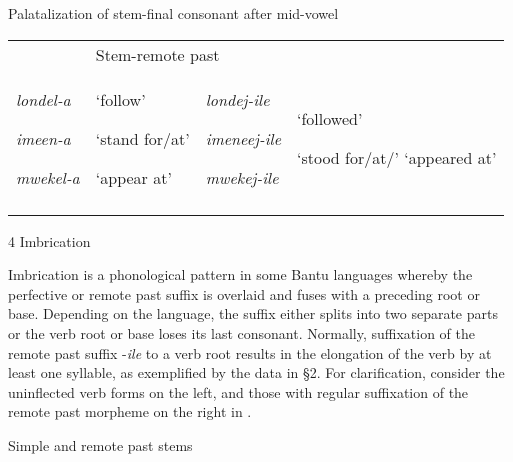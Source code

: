 \documentclass[output=paper]{langsci/langscibook}
\begin{document}
\begin{stylelsTableHeading}%
\begin{table}
\caption{Palatalization of stem-final consonant after mid-vowel}
\label{tab:17}
\end{table}\end{stylelsTableHeading}

\begin{tabular}{llll}
\lsptoprule
\multicolumn{2}{l}{\mdseries Stem-FV } & \multicolumn{2}{l}{\mdseries Stem-remote past}\\
{\mdseries \emph{londel-a}}

{\mdseries \emph{imeen-a}}

\mdseries \emph{mwekel-a} & {\mdseries ‘follow’}

{\mdseries ‘stand for/at’}

\mdseries ‘appear at’ & {\mdseries \emph{londej-ile}}

{\mdseries \emph{imeneej-ile}}

\mdseries \emph{mwekej-ile} & {\mdseries ‘followed’}

\mdseries ‘stood for/at/’ ‘appeared at’\\
\lspbottomrule
\end{tabular}
\begin{stylelsSectioni}
4 Imbrication
\end{stylelsSectioni}

Imbrication is a phonological pattern in some Bantu languages whereby the perfective or remote past suffix is overlaid and fuses with a preceding root or base. Depending on the language, the suffix either splits into two separate parts or the verb root or base loses its last consonant. Normally, suffixation of the remote past suffix -\emph{ile} to a verb root results in the elongation of the verb by at least one syllable, as exemplified by the data in §2. For clarification, consider the uninflected verb forms on the left, and those with regular suffixation of the remote past morpheme on the right in . 

\begin{stylelsTableHeading}%
\begin{table}
\caption{Simple and remote past stems}
\label{tab:18}
\end{table}\end{stylelsTableHeading}
\end{document}
